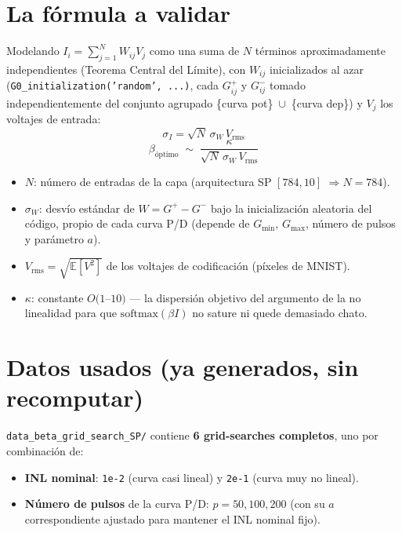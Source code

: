 \documentclass[11pt]{article}
\begin{document}
\section{La fórmula a validar}

Modelando $I_i = \sum_{j=1}^{N} W_{ij}V_j$ como una suma de $N$ términos
aproximadamente independientes (Teorema Central del Límite), con $W_{ij}$
inicializados al azar (\texttt{G0\_initialization('random', ...)}, cada
$G^+_{ij}$ y $G^-_{ij}$ tomado independientemente del conjunto agrupado
\{curva pot\}~$\cup$~\{curva dep\}) y $V_j$ los voltajes de entrada:
\[
\sigma_I = \sqrt{N}\,\sigma_W\,V_{\mathrm{rms}}
\]
\begin{equation}
\beta_{\text{óptimo}} \;\sim\; \frac{\kappa}{\sqrt{N}\,\sigma_W\,V_{\mathrm{rms}}}
\label{eq:beta_opt}
\end{equation}
\begin{itemize}
\item $N$: número de entradas de la capa (arquitectura SP $[784,10]$
  $\Rightarrow N=784$).
\item $\sigma_W$: desvío estándar de $W=G^+-G^-$ bajo la inicialización
  aleatoria del código, propio de cada curva P/D (depende de $G_{\min}$,
  $G_{\max}$, número de pulsos y parámetro $a$).
\item $V_{\mathrm{rms}}=\sqrt{\mathbb{E}[V^2]}$ de los voltajes de
  codificación (píxeles de MNIST).
\item $\kappa$: constante $O(1$--$10)$ --- la dispersión objetivo del
  argumento de la no linealidad para que $\mathrm{softmax}(\beta I)$ no
  sature ni quede demasiado chato.
\end{itemize}

\section{Datos usados (ya generados, sin recomputar)}

\texttt{data\_beta\_grid\_search\_SP/} contiene \textbf{6 grid-searches
completos}, uno por combinación de:
\begin{itemize}
\item \textbf{INL nominal}: \texttt{1e-2} (curva casi lineal) y
  \texttt{2e-1} (curva muy no lineal).
\item \textbf{Número de pulsos} de la curva P/D: $p=50,100,200$ (con su $a$
  correspondiente ajustado para mantener el INL nominal fijo).
\end{itemize}
\end{document}
